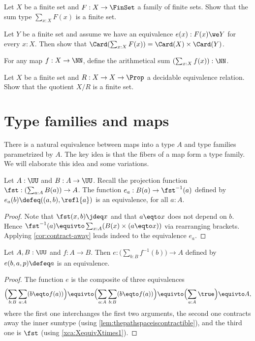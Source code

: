 \begin{xca}\label{xca:fin-sum-of-finsets}
Let $X$ be a finite set and $F: X\to\FinSet$ a family of finite sets.
Show that the sum type $\sum_{x:X}F(x)$ is a finite set.

Let $Y$ be a finite set and assume we have an equivalence
$e(x) : F(x) \we Y$ for every $x:X$. Then show 
that $\Card(\sum_{x:X}F(x)) = \Card(X)\times\Card(Y)$.

For any map $f:X\to\NN$, 
define the arithmetical sum $(\sum_{x:X} f(x)):\NN$.
\end{xca}

\begin{xca}\label{xca:dec-quot-finite-set}
Let $X$ be a finite set and $R:X\to X\to\Prop$ a decidable
equivalence relation. Show that the quotient $X/R$ is a finite set.
\end{xca}

\section{Type families and maps}
\label{sec:typefam}

There is a natural equivalence between maps into a type $A$
and type families parametrized by $A$. The key idea is that the
fibers of a map form a type family. We will elaborate this
idea and some variations.


\begin{lemma}\label{lem:fst-fiber(a)=B(a)}
Let $A:\UU$ and $B:A\to\UU$.
Recall the projection function $\fst: (\sum_{a:A} B(a))\to A$.
The function $e_a: B(a) \to \fst^{-1}(a)$ defined by
$e_a(b)\defeq ((a,b),\refl{a})$ is an equivalence,
for all $a:A$.
\end{lemma}
\begin{proof}
Note that $\fst(x,b)\jdeq x$ and that $a \eqto x$ does
not depend on $b$. Hence
$\fst^{-1}(a) \equivto \sum_{x:A}  (B(x) \times (a \eqto x))$
via rearranging brackets.
Applying \cref{cor:contract-away} leads indeed to
the equivalence $e_a$.
\end{proof}

\begin{lemma}\label{lem:sum-of-fibers}
Let $A,B:\UU$ and $f:A\to B$.
Then $e: \bigl(\sum_{b:B} f^{-1}(b)\bigr)\to A$ defined by
$e(b,a,p)\defeq a$ is an equivalence.
\end{lemma}
\begin{proof}
The function $e$ is the composite of three equivalences
\[
\Bigl(\sum_{b:B} \sum_{a:A} (b\eqto f(a))\Bigr) \equivto
\Bigl(\sum_{a:A} \sum_{b:B} (b\eqto f(a))\Bigr) \equivto
\Bigl(\sum_{a:A} \true\Bigr) \equivto A,
\]
where the first one interchanges the first two arguments, 
the second one contracts away the inner sumtype
(using \cref{lem:thepathspaceiscontractible}), and the third one
is $\fst$ (using \cref{xca:XequivXtimes1}).
\end{proof}

